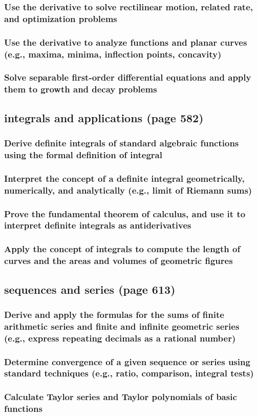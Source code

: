 \documentclass[11pt]{article}
\begin{document}
\subsubsection{Use the derivative to solve rectilinear motion, related rate, and optimization problems}
\label{sec:org93250a9}
\subsubsection{Use the derivative to analyze functions and planar curves (e.g., maxima, minima, inflection points, concavity)}
\label{sec:orgaa6eb2c}
\subsubsection{Solve separable first-order differential equations and apply them to growth and decay problems}
\label{sec:org4e8f99a}
\subsection{integrals and applications (page 582)}
\label{sec:org14f5ea1}
\subsubsection{Derive definite integrals of standard algebraic functions using the formal definition of integral}
\label{sec:org05444fa}
\subsubsection{Interpret the concept of a definite integral geometrically, numerically, and analytically (e.g., limit of Riemann sums)}
\label{sec:orgcd31e2d}
\subsubsection{Prove the fundamental theorem of calculus, and use it to interpret definite integrals as antiderivatives}
\label{sec:org4caac6d}
\subsubsection{Apply the concept of integrals to compute the length of curves and the areas and volumes of geometric figures}
\label{sec:org458f24a}
\subsection{sequences and series (page 613)}
\label{sec:orgb4c186a}
\subsubsection{Derive and apply the formulas for the sums of finite arithmetic series and finite and infinite geometric series (e.g., express repeating decimals as a rational number)}
\label{sec:orgd8139fa}
\subsubsection{Determine convergence of a given sequence or series using standard techniques (e.g., ratio, comparison, integral tests)}
\label{sec:org84b3974}
\subsubsection{Calculate Taylor series and Taylor polynomials of basic functions}
\label{sec:org7d344ed}
\end{document}
